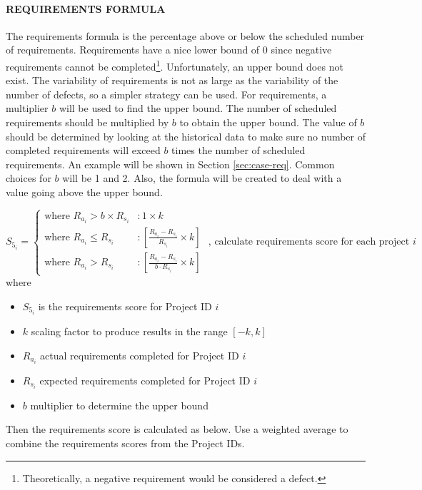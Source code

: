 \documentclass[SDSUThesis.tex]{subfiles}
\begin{document}
            \paragraph{REQUIREMENTS FORMULA}
                The requirements formula is the percentage above or below the
                scheduled number of requirements. Requirements have a nice
                lower bound of 0 since negative requirements cannot be 
                completed\footnote{Theoretically, a negative requirement would
                be considered a defect.}.  Unfortunately, an upper bound
                does not exist.  The variability of requirements is not
                as large as the variability of the number of defects, so
                a simpler strategy can be used.  For requirements, a 
                multiplier $b$ will be used to find the upper bound. The
                number of scheduled requirements should be multiplied by
                $b$ to obtain the upper bound.  The value of $b$ should
                be determined by looking at the historical data to make sure
                no number of completed requirements will exceed $b$ times
                the number of scheduled requirements. An example will be shown
                in Section \ref{sec:case-req}. Common choices for $b$ will be 1
                and 2. Also, the formula will be
                created to deal with a value going above the upper bound.
                
                \begin{displaymath}
                   S_{5_i} = \left\{
                     \begin{array}{lr}
                       \text{where } R_{a_i} > b \times R_{s_i} & :  1 \times k \\
                       \text{where } R_{a_i} \leq R_{s_i} & : \left[ \frac{R_{a_i} - R_{s_i}}{R_{s_i}}\times k \right] \\
                       \text{where } R_{a_i} > R_{s_i}  & : \left[ \frac{R_{a_i} - R_{s_i} }{b \cdot R_{s_i}}\times k \right]
                     \end{array}
                   \right. \text{   , calculate requirements score for each project $i$}
                \end{displaymath}
                where
                \begin{itemize}
                    \item $S_{5_i}$ is the requirements score for Project ID $i$
                    \item $k$ scaling factor to produce results in the range $[-k,k]$
                    \item $R_{a_i}$ actual requirements completed for Project ID $i$
                    \item $R_{s_i}$ expected requirements completed for Project ID $i$
                    \item $b$ multiplier to determine the upper bound
                \end{itemize}
                Then the requirements score is calculated as below.  
                Use a weighted average to combine the requirements scores
                from the Project IDs.
                
\end{document}
